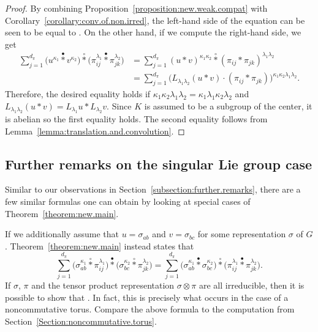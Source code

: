\documentclass[10pt,a4paper]{amsart}
\numberwithin{equation}{section}
\theoremstyle{definition}
\newcommand{\stardot}{\overset{{\bullet}}{*}}
\newcommand{\starcirc}{\overset{\circ}{*}}
\begin{document}
\begin{proof}
By combining Proposition~\ref{proposition:new.weak.compat} with Corollary~\ref{corollary:conv.of.non.irred}, the left-hand side of the equation can be seen to be equal to
.
 On the other hand, if we compute the right-hand side, we get
 \begin{align*}
     \sum_{j = 1}^{d_\pi} \big( u^{\kappa_1} \stardot  v^{\kappa_2} \big) \starcirc \big(\pi_{ij}^{\lambda_1} \stardot \pi_{jk}^{\lambda_2} \big)
     &=   \sum_{j = 1}^{d_\pi} (u * v)^{\kappa_1 \kappa_2} \starcirc (\pi_{ij} *\pi_{jk})^{\lambda_1 \lambda_2} \\
     &= \sum_{j=1}^{d_\pi} \big( L_{\lambda_1 \lambda_2} (u * v) \cdot (\pi_{ij} * \pi_{jk} ) \big)^{\kappa_1 \kappa_2 \lambda_1 \lambda_2 }.
 \end{align*}
 Therefore, the desired equality holds if
$\kappa_1 \kappa_2 \lambda_1 \lambda_2 = \kappa_1 \lambda_1 \kappa_2 \lambda_2$
 and
$ L_{\lambda_1 \lambda_2} (u * v) = L_{\lambda_1} u * L_{\lambda_2} v$.
Since $ K $ is assumed to be a subgroup of the center, it is abelian so the first equality holds. The second equality follows from Lemma~\ref{lemma:translation.and.convolution}.
\end{proof}


\subsection{Further remarks on the singular Lie group case}
Similar to our observations in Section~\ref{subsection:further.remarks}, there are a few similar formulas one can obtain by looking at special cases of Theorem~\ref{theorem:new.main}.

If we additionally assume that $ u = \sigma_{ab} $ and $ v = \sigma_{bc} $ for some representation $ \sigma $ of $ G $. Theorem~\ref{theorem:new.main} instead states that
  \[
   \sum_{j = 1}^{d_\pi} \big( \sigma_{ab}^{\kappa_1} \starcirc \pi_{ij}^{\lambda_1} \big) \stardot \big( \sigma_{bc}^{\kappa_2} \starcirc \pi_{jk}^{\lambda_2} \big) =   \sum_{j = 1}^{d_\pi} \big( \sigma_{ab}^{\kappa_1} \stardot  \sigma_{bc}^{\kappa_2} \big) \starcirc \big(\pi_{ij}^{\lambda_1} \stardot \pi_{jk}^{\lambda_2} \big).
  \]
  If $ \sigma $, $ \pi $ and the tensor product representation $ \sigma \otimes \pi $ are all irreducible, then it is possible to show that
    \smash{$
    \big( \sigma_{ab}^{\kappa_1} \starcirc \pi_{ij}^{\lambda_1} \big) \stardot \big( \sigma_{bc}^{\kappa_2} \starcirc \pi_{jk}^{\lambda_2} \big) =  \big( \sigma_{ab}^{\kappa_1} \stardot  \sigma_{bc}^{\kappa_2} \big) \starcirc \big(\pi_{ij}^{\lambda_1} \stardot \pi_{jk}^{\lambda_2} \big)$}.
  In fact, this is precisely what occurs in the case of a noncommutative torus. Compare the above formula to the computation from Section~\ref{Section:noncommutative.torus}.
\end{document}
